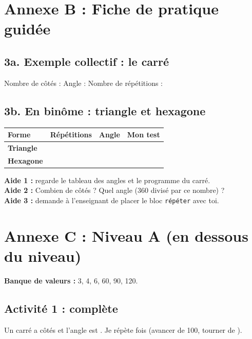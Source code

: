 \documentclass[11pt,a4paper]{article}
\begin{document}
\section*{Annexe B : Fiche de pratique guidée}

\subsection*{3a. Exemple collectif : le carré}
Nombre de côtés : \dotfill\quad Angle : \dotfill\quad Nombre de répétitions : \dotfill

\subsection*{3b. En binôme : triangle et hexagone}
\begin{tabularx}{\linewidth}{>{\bfseries}p{3cm}Y Y Y}
\toprule
Forme & Répétitions & Angle & Mon test\\
\midrule
Triangle & & & \\
Hexagone & & & \\
\bottomrule
\end{tabularx}

\begin{tcolorbox}[colback=yellow!10,colframe=yellow!50!black,title={Cartes d'aide à utiliser dans l'ordre},fonttitle=\bfseries\small]
\textbf{Aide 1 :} regarde le tableau des angles et le programme du carré.\\
\textbf{Aide 2 :} Combien de côtés ? Quel angle (360 divisé par ce nombre) ?\\
\textbf{Aide 3 :} demande à l'enseignant de placer le bloc \texttt{répéter} avec toi.
\end{tcolorbox}

\newpage
\section*{Annexe C : Niveau A (en dessous du niveau)}

\textbf{Banque de valeurs :} 3, 4, 6, 60, 90, 120.

\subsection*{Activité 1 : complète}
Un carré a \dotfill{} côtés et l'angle est \dotfill. Je répète \dotfill{} fois (avancer de 100, tourner de \dotfill).
\end{document}
